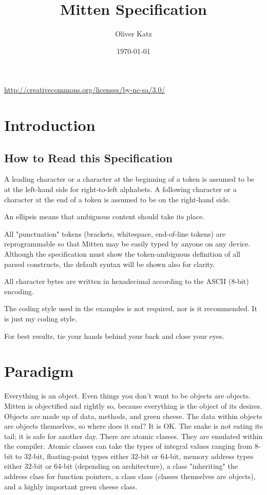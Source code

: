 \documentclass[10pt,a4paper]{article}
\author{Oliver Katz}
\title{Mitten Specification}
\date{\today}
\begin{document}
\maketitle
\begin{center}
\ccbyncsa \linebreak
\url{http://creativecommons.org/licenses/by-nc-sa/3.0/}
\end{center}
\tableofcontents

\section{Introduction}
\subsection{How to Read this Specification}
A leading character or a character at the beginning of a token is assumed to be at the left-hand side for right-to-left alphabets. A following character or a character at the end of a token is assumed to be on the right-hand side. 

An ellipsis means that ambiguous content should take its place.

All "punctuation" tokens (brackets, whitespace, end-of-line tokens) are reprogrammable so that Mitten may be easily typed by anyone on any device. Although the specification must show the token-ambiguous definition of all parsed constructs, the default syntax will be shown also for clarity. 

All character bytes are written in hexadecimal according to the ASCII (8-bit) encoding. 

The coding style used in the examples is not required, nor is it recommended. It is just my coding style.

For best results, tie your hands behind your back and close your eyes.

\section{Paradigm}
Everything is an object. Even things you don't want to be objects are objects. Mitten is objectified and rightly so, because everything is the object of its desires. Objects are made up of data, methods, and green cheese. The data within objects are objects themselves, so where does it end? It is OK. The snake is not eating its tail; it is safe for another day. There are atomic classes. They are emulated within the compiler. Atomic classes can take the types of integral values ranging from 8-bit to 32-bit, floating-point types either 32-bit or 64-bit, memory address types either 32-bit or 64-bit (depending on architecture), a class "inheriting" the address class for function pointers, a class class (classes themselves are objects), and a highly important green cheese class.
\end{document}
